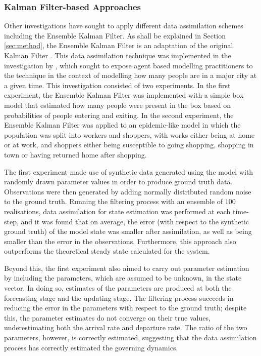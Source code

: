 \subsubsection{Kalman Filter-based Approaches}\label{subs:lit_rev:da_abm:kf}

Other investigations have sought to apply different data assimilation schemes
including the Ensemble Kalman Filter.
As shall be explained in Section \ref{sec:method}, the Ensemble Kalman Filter is an
adaptation of the original Kalman Filter \citep{evensen2003ensemble}.
This data assimilation technique was implemented in the investigation by
\citet{ward2016dynamic}, which sought to expose agent based modelling
practitioners to the technique in the context of modelling how many people are
in a major city at a given time.
This investigation consisted of two experiments.
In the first experiment, the Ensemble Kalman Filter was implemented with a
simple box model that estimated how many people were present in the box based on
probabilities of people entering and exiting.
In the second experiment, the Ensemble Kalman Filter was applied to an
epidemic-like model in which the population was split into workers and shoppers,
with works either being at home or at work, and shoppers either being
susceptible to going shopping, shopping in town or having returned home after
shopping.

The first experiment made use of synthetic data generated using the model with
randomly drawn parameter values in order to produce ground truth data.
Observations were then generated by adding normally distributed random noise to the
ground truth.
Running the filtering process with an ensemble of $100$ realisations, data
assimilation for state estimation was performed at each time-step, and it was
found that on average, the error (with respect to the synthetic ground truth) of
the model state was smaller after assimilation, as well as being smaller than
the error in the observations.
Furthermore, this approach also outperforms the theoretical steady state
calculated for the system.

Beyond this, the first experiment also aimed to carry out parameter estimation
by including the parameters, which are assumed to be unknown, in the state vector.
In doing so, estimates of the parameters are produced at both the forecasting
stage and the updating stage.
The filtering process succeeds in reducing the error in the parameters with
respect to the ground truth; despite this, the parameter estimates do not
converge on their true values, underestimating both the arrival rate and
departure rate.
The ratio of the two parameters, however, is correctly estimated, suggesting
that the data assimilation process has correctly estimated the governing
dynamics.


